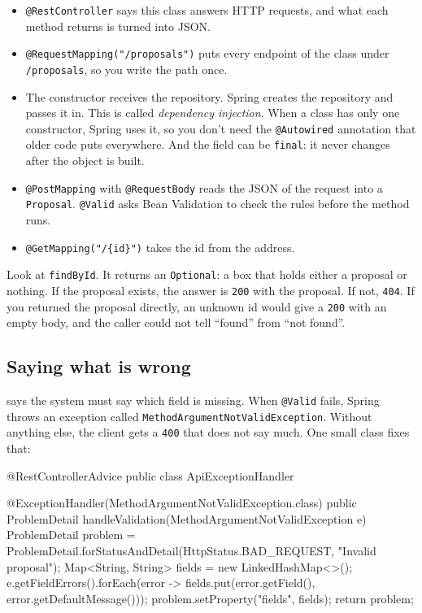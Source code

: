 \begin{itemize}
  \item \texttt{@RestController} says this class answers HTTP requests, and
        what each method returns is turned into JSON.
  \item \texttt{@RequestMapping("/proposals")} puts every endpoint of the
        class under \texttt{/proposals}, so you write the path once.
  \item The constructor receives the repository. Spring creates the
        repository and passes it in. This is called \emph{dependency
        injection}. When a class has only one constructor, Spring uses it, so
        you don't need the \texttt{@Autowired} annotation that older code
        puts everywhere. And the field can be \texttt{final}: it never
        changes after the object is built.
  \item \texttt{@PostMapping} with \texttt{@RequestBody} reads the JSON of the
        request into a \texttt{Proposal}. \texttt{@Valid} asks Bean Validation
        to check the rules before the method runs.
  \item \texttt{@GetMapping("/\{id\}")} takes the id from the address.
\end{itemize}

Look at \texttt{findById}. It returns an \texttt{Optional}: a box that holds
either a proposal or nothing. If the proposal exists, the answer is
\texttt{200} with the proposal. If not, \texttt{404}. If you returned the
proposal directly, an unknown id would give a \texttt{200} with an empty body,
and the caller could not tell ``found'' from ``not found''.

\subsection*{Saying what is wrong}

 says the system must say which field is missing. When
\texttt{@Valid} fails, Spring throws an exception called
\texttt{MethodArgumentNotValidException}. Without anything else, the client
gets a \texttt{400} that does not say much. One small class fixes that:

\begin{code}
@RestControllerAdvice
public class ApiExceptionHandler {

    @ExceptionHandler(MethodArgumentNotValidException.class)
    public ProblemDetail handleValidation(MethodArgumentNotValidException e) {
        ProblemDetail problem = ProblemDetail.forStatusAndDetail(HttpStatus.BAD_REQUEST, "Invalid proposal");
        Map<String, String> fields = new LinkedHashMap<>();
        e.getFieldErrors().forEach(error -> fields.put(error.getField(), error.getDefaultMessage()));
        problem.setProperty("fields", fields);
        return problem;
    }
}
\end{code}

